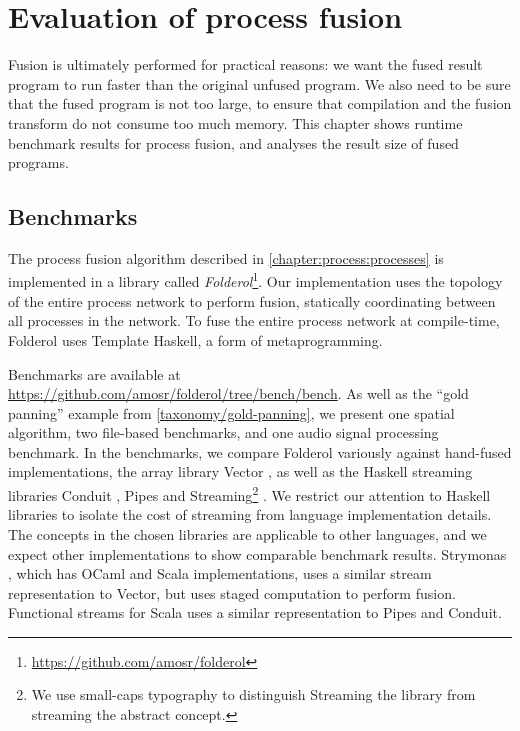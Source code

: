 \chapter{Evaluation of process fusion}
\label{s:Benchmarks}
Fusion is ultimately performed for practical reasons: we want the fused result program to run faster than the original unfused program.
We also need to be sure that the fused program is not too large, to ensure that compilation and the fusion transform do not consume too much memory.
This chapter shows runtime benchmark results for process fusion, and analyses the result size of fused programs.

\section{Benchmarks}

The process fusion algorithm described in \cref{chapter:process:processes} is implemented in a library called \emph{Folderol}\footnote{\url{https://github.com/amosr/folderol}}.
Our implementation uses the topology of the entire process network to perform fusion, statically coordinating between all processes in the network.
To fuse the entire process network at compile-time, Folderol uses Template Haskell, a form of metaprogramming.

\newcommand\Streaming[0] {{\sc Streaming}\xspace}
Benchmarks are available at \url{https://github.com/amosr/folderol/tree/bench/bench}.
As well as the ``gold panning'' example from \cref{taxonomy/gold-panning}, we present one spatial algorithm, two file-based benchmarks, and one audio signal processing benchmark.
In the benchmarks, we compare Folderol variously against hand-fused implementations, the array library Vector \cite{hackage:vector}, as well as the Haskell streaming libraries Conduit \cite{hackage:conduit}, Pipes \cite{hackage:pipes} and \Streaming\footnote{We use small-caps typography to distinguish \Streaming the library from streaming the abstract concept.} \cite{hackage:streaming}.
We restrict our attention to Haskell libraries to isolate the cost of streaming from language implementation details.
The concepts in the chosen libraries are applicable to other languages, and we expect other implementations to show comparable benchmark results.
Strymonas \citep{kiselyov2016stream}, which has OCaml and Scala implementations, uses a similar stream representation to Vector, but uses staged computation to perform fusion.
Functional streams for Scala \citep{package:scala:fs2} uses a similar representation to Pipes and Conduit.


